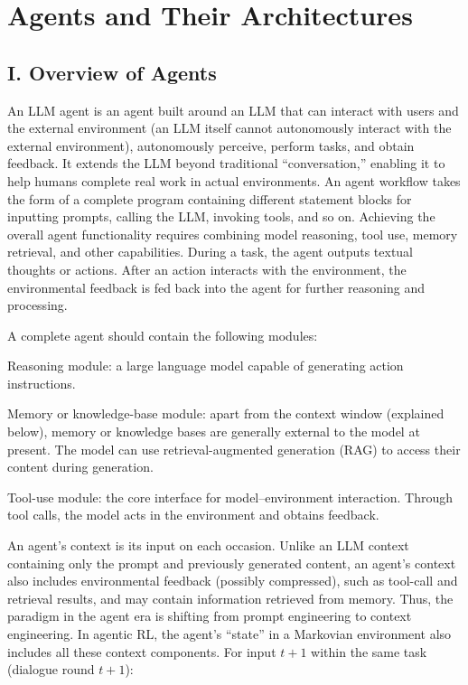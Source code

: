 \setcounter{section}{0}

\hypertarget{agents-and-their-architectures}{%
\section{Agents and Their Architectures}\label{agents-and-their-architectures}}

\hypertarget{i.-overview-of-agents}{%
\subsection{I. Overview of Agents}\label{i.-overview-of-agents}}

An LLM agent is an agent built around an LLM that can interact with users and the external environment (an LLM itself cannot autonomously interact with the external environment), autonomously perceive, perform tasks, and obtain feedback. It extends the LLM beyond traditional ``conversation,'' enabling it to help humans complete real work in actual environments. An agent workflow takes the form of a complete program containing different statement blocks for inputting prompts, calling the LLM, invoking tools, and so on. Achieving the overall agent functionality requires combining model reasoning, tool use, memory retrieval, and other capabilities. During a task, the agent outputs textual thoughts or actions. After an action interacts with the environment, the environmental feedback is fed back into the agent for further reasoning and processing.

A complete agent should contain the following modules:

Reasoning module: a large language model capable of generating action instructions.

Memory or knowledge-base module: apart from the context window (explained below), memory or knowledge bases are generally external to the model at present. The model can use retrieval-augmented generation (RAG) to access their content during generation.

Tool-use module: the core interface for model--environment interaction. Through tool calls, the model acts in the environment and obtains feedback.

An agent's context is its input on each occasion. Unlike an LLM context containing only the prompt and previously generated content, an agent's context also includes environmental feedback (possibly compressed), such as tool-call and retrieval results, and may contain information retrieved from memory. Thus, the paradigm in the agent era is shifting from prompt engineering to context engineering. In agentic RL, the agent's ``state'' in a Markovian environment also includes all these context components. For input \(t+1\) within the same task (dialogue round \(t+1\)):

